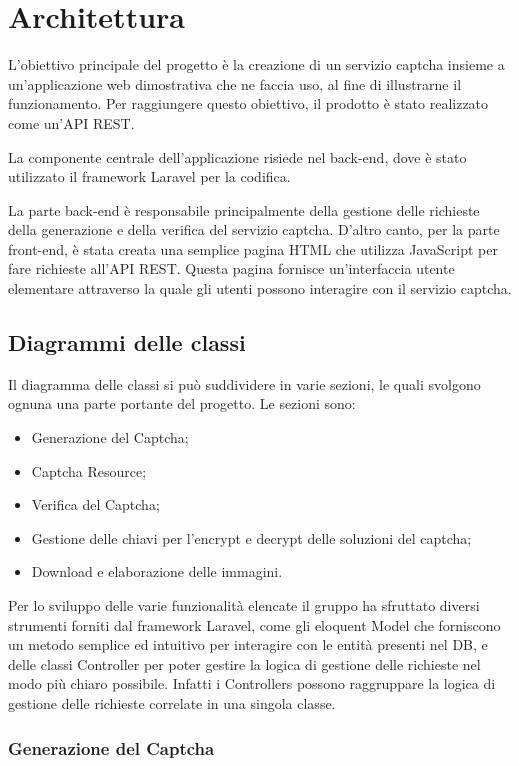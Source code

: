 \section{Architettura}
L'obiettivo principale del progetto è la creazione di un servizio captcha insieme a un'applicazione web 
dimostrativa che ne faccia uso, al fine di illustrarne il funzionamento. Per raggiungere questo obiettivo, 
il prodotto è stato realizzato come un'API REST.

La componente centrale dell'applicazione risiede nel back-end, dove è stato utilizzato il framework Laravel 
per la codifica.

La parte back-end è responsabile principalmente della gestione delle richieste della generazione e della verifica del servizio captcha. 
D'altro canto, per la parte front-end, è stata creata una semplice pagina HTML che utilizza JavaScript per fare 
richieste all'API REST. Questa pagina fornisce un'interfaccia utente elementare attraverso la quale gli utenti possono 
interagire con il servizio captcha.

\subsection{Diagrammi delle classi}

Il diagramma delle classi si può suddividere in varie sezioni, le quali svolgono ognuna una parte portante del progetto. Le sezioni sono:
\begin{itemize}
    \item Generazione del Captcha;
    \item Captcha Resource;
    \item Verifica del Captcha;
    \item Gestione delle chiavi per l'encrypt e decrypt delle soluzioni del captcha;
    \item Download e elaborazione delle immagini.
\end{itemize}

Per lo sviluppo delle varie funzionalità elencate il gruppo ha sfruttato diversi strumenti forniti dal framework Laravel, 
come gli eloquent Model che forniscono un metodo semplice ed intuitivo per interagire con le entità presenti nel DB, e delle classi 
Controller per poter gestire la logica di gestione delle richieste nel modo più chiaro possibile. Infatti i Controllers possono 
raggruppare la logica di gestione delle richieste correlate in una singola classe.

\subsubsection{Generazione del Captcha}

